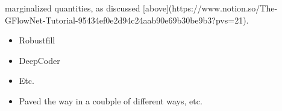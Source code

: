 marginalized quantities, as discussed [above](https://www.notion.so/The-GFlowNet-Tutorial-95434ef0e2d94c24aab90e69b30be9b3?pvs=21).




\begin{itemize}
    \item Robustfill
    \item DeepCoder
    \item Etc.
    \item Paved the way in a coubple of different ways, etc.
\end{itemize}















    
    
    
    


        
